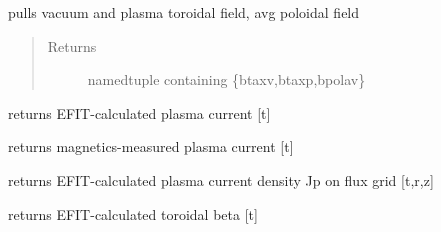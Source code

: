 \documentclass[letterpaper,10pt,english]{sphinxmanual}
\begin{document}
\begin{fulllineitems}
\begin{fulllineitems}
\end{fulllineitems}


\begin{fulllineitems}
\label{eqtools:eqtools.EFIT.EFITTree.getFields}
pulls vacuum and plasma toroidal field, avg poloidal field
\begin{quote}\begin{description}
\item[{Returns}] \leavevmode
namedtuple containing \{btaxv,btaxp,bpolav\}

\end{description}\end{quote}

\end{fulllineitems}


\begin{fulllineitems}
\label{eqtools:eqtools.EFIT.EFITTree.getIpCalc}
returns EFIT-calculated plasma current {[}t{]}

\end{fulllineitems}


\begin{fulllineitems}
\label{eqtools:eqtools.EFIT.EFITTree.getIpMeas}
returns magnetics-measured plasma current {[}t{]}

\end{fulllineitems}


\begin{fulllineitems}
\label{eqtools:eqtools.EFIT.EFITTree.getJp}
returns EFIT-calculated plasma current density Jp on flux grid {[}t,r,z{]}

\end{fulllineitems}


\begin{fulllineitems}
\label{eqtools:eqtools.EFIT.EFITTree.getBetaT}
returns EFIT-calculated toroidal beta {[}t{]}


\end{fulllineitems}
\end{fulllineitems}
\end{document}
